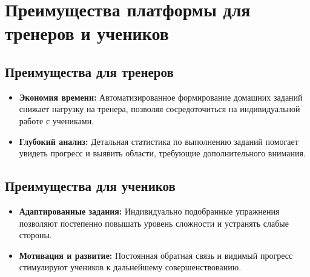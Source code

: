\documentclass[a4paper,12pt]{article}
\begin{document}
\section{Преимущества платформы для тренеров и учеников}

\subsection{Преимущества для тренеров}
\begin{itemize}
    \item \textbf{Экономия времени:} Автоматизированное формирование домашних заданий снижает нагрузку на тренера, позволяя сосредоточиться на индивидуальной работе с учениками.
    \item \textbf{Глубокий анализ:} Детальная статистика по выполнению заданий помогает увидеть прогресс и выявить области, требующие дополнительного внимания.
\end{itemize}

\subsection{Преимущества для учеников}
\begin{itemize}
    \item \textbf{Адаптированные задания:} Индивидуально подобранные упражнения позволяют постепенно повышать уровень сложности и устранять слабые стороны.
    \item \textbf{Мотивация и развитие:} Постоянная обратная связь и видимый прогресс стимулируют учеников к дальнейшему совершенствованию.
\end{itemize}

\end{document}
